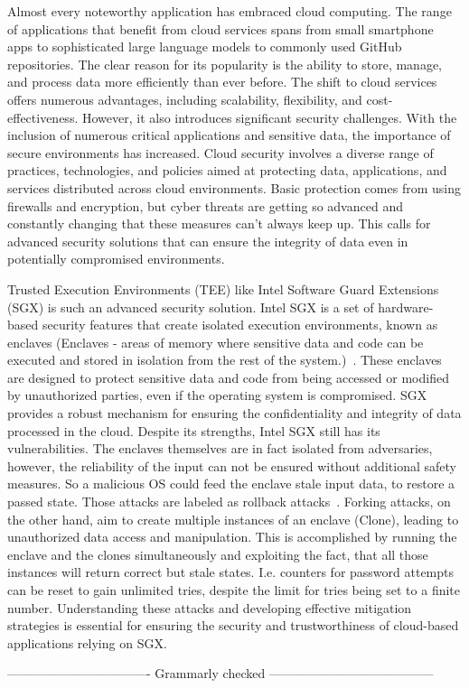 
Almost every noteworthy application has embraced cloud computing. The range of applications that benefit from cloud services spans from small smartphone apps to sophisticated large language models to commonly used GitHub repositories. The clear reason for its popularity is the ability to store, manage, and process data more efficiently than ever before. The shift to cloud services offers numerous advantages, including scalability, flexibility, and cost-effectiveness. However, it also introduces significant security challenges. With the inclusion of numerous critical applications and sensitive data, the importance of secure environments has increased. Cloud security involves a diverse range of practices, technologies, and policies aimed at protecting data, applications, and services distributed across cloud environments. Basic protection comes from using firewalls and encryption, but cyber threats are getting so advanced and constantly changing that these measures can't always keep up. This calls for advanced security solutions that can ensure the integrity of data even in potentially compromised environments.


Trusted Execution Environments (TEE) like Intel Software Guard Extensions (SGX) is such an advanced security solution. Intel SGX is a set of hardware-based security features that create isolated execution environments, known as enclaves (Enclaves -  areas of memory where sensitive data and code can be executed and stored in isolation from the rest of the system.)~\cite{nfw}. These enclaves are designed to protect sensitive data and code from being accessed or modified by unauthorized parties, even if the operating system is compromised. SGX provides a robust mechanism for ensuring the confidentiality and integrity of data processed in the cloud. Despite its strengths, Intel SGX still has its vulnerabilities. The enclaves themselves are in fact isolated from adversaries, however, the reliability of the input can not be ensured without additional safety measures. So a malicious OS could feed the enclave stale input data, to restore a passed state. Those attacks are labeled as rollback attacks~\cite{esccc}. 
Forking attacks, on the other hand, aim to create multiple instances of an enclave (Clone), leading to unauthorized data access and manipulation. This is accomplished by running the enclave and the clones simultaneously and exploiting the fact, that all those instances will return correct but stale states. I.e. counters for password attempts can be reset to gain unlimited tries, despite the limit for tries being set to a finite number. Understanding these attacks and developing effective mitigation strategies is essential for ensuring the security and trustworthiness of cloud-based applications relying on SGX.

---------------------------------- Grammarly checked ---------------------------------------